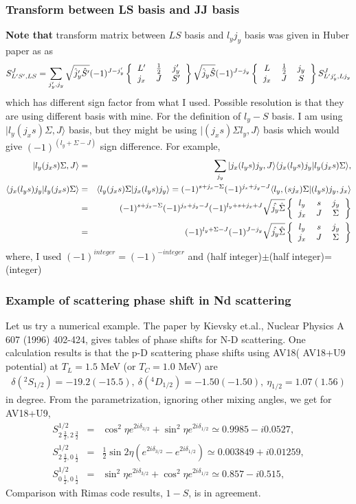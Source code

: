 \documentclass[10pt]{article}
\newcommand{\bea}{\begin{eqnarray}}
\newcommand{\eea}{\end{eqnarray}}
\newcommand{\no}{\nonumber \\}
\def\la{\langle}
\def\ra{\rangle}
\newcommand{\sixjsymbol}[6]
{\left\{\begin{tabular}{ccc} {$#1$}&{$#2$}&{$#3$}\\
                             {$#4$}&{$#5$}&{$#6$} \end{tabular}\right\}}
\begin{document}
\subsubsection{Transform between LS basis and JJ basis}
{\bf Note that} transform matrix between $LS$ basis and $l_y j_y$ basis was given in Huber paper as
as
\bea
S^{J}_{L' S',LS}
=\sum_{j'_y,j_y} \sqrt{\hat{j}'_y\hat{S}'}(-1)^{J-j'_y}
                 \sixjsymbol{L'}{\frac{1}{2}}{j'_y}{j_x}{J}{S'}
                 \sqrt{\hat{j}_y\hat{S}}(-1)^{J-j_y}
                 \sixjsymbol{L}{\frac{1}{2}}{j_y}{j_x}{J}{S}
                 S^J_{L' j'_y,L j_y}
\eea
which has different sign factor from what I used.
Possible resolution is that they are using different basis with mine.
For the definition of $l_y-S$ basis.
I am using $|l_y (j_x s) \Sigma,J\ra$ basis, but they might be using
$|(j_x s)\Sigma l_y, J\ra$ basis which would give 
$(-1)^{(l_y+\Sigma-J)}$ sign difference.
For example,
\bea
|l_y (j_x s)\Sigma,J\ra
&=&\sum_{j_y} |j_x(l_y s) j_y, J\ra
  \la j_x(l_y s) j_y |l_y (j_x s)\Sigma\ra,\no
\la j_x(l_y s) j_y |l_y (j_x s)\Sigma\ra
&=& \la l_y (j_x s)\Sigma|j_x(l_y s) j_y \ra
  =(-1)^{s+j_x-\Sigma}(-1)^{j_x+j_y-J}
   \la l_y, (s j_x)\Sigma| (l_y s) j_y, j_x\ra \no
  &=&(-1)^{s+j_x-\Sigma}(-1)^{j_x+j_y-J}
   (-1)^{l_y+s+j_x+J} 
   \sqrt{\hat{j_y}\hat{\Sigma}}
   \sixjsymbol{l_y}{s}{j_y}{j_x}{J}{\Sigma} \no
  &=&(-1)^{l_y+\Sigma-J}(-1)^{J-j_y}  
    \sqrt{\hat{j_y}\hat{\Sigma}}
     \sixjsymbol{l_y}{s}{j_y}{j_x}{J}{\Sigma}        
\eea
where, I used $(-1)^{integer}=(-1)^{-integer}$
and (half integer)$\pm$(half integer)=(integer)

\subsubsection{Example of scattering phase shift in Nd scattering} 
Let us try a numerical example. 
The paper by Kievsky et.al., Nuclear Physics A 607 (1996) 402-424,
gives tables of phase shifts for N-D scattering. 
One calculation results is that the p-D scattering 
phase shifts using AV18( AV18+U9 potential) at $T_L=1.5$ MeV (or $T_C=1.0$ MeV) are
\bea 
\delta({}^2S_{1/2})=-19.2(-15.5),\ \delta({}^4D_{1/2})=-1.50(-1.50),\ \eta_{1/2}=1.07(1.56)
\eea 
in degree.
From the parametrization, ignoring other mixing angles, we get for AV18+U9,
\bea 
S^{1/2}_{2\ \frac{3}{2},2\ \frac{3}{2}}&=&
 \cos^2\eta e^{2i\delta_{3/2}}+\sin^2\eta e^{2i\delta_{1/2}}\simeq
  0.9985-i 0.0527,  \no 
S^{1/2}_{2\ \frac{3}{2},0\ \frac{1}{2}}&=& 
 \frac{1}{2}\sin 2\eta (e^{2i\delta_{3/2}}-e^{2i\delta_{1/2}})\simeq 
 0.003849+i 0.01259, \no 
S^{1/2}_{0\ \frac{1}{2},0\ \frac{1}{2}}&=& 
 \sin^2\eta e^{2i\delta_{3/2}}+\cos^2\eta e^{2i\delta_{1/2}}\simeq
 0.857-i 0.515,
\eea 
Comparison with Rimas code results, $1-S$,  is in agreement.
\end{document}
